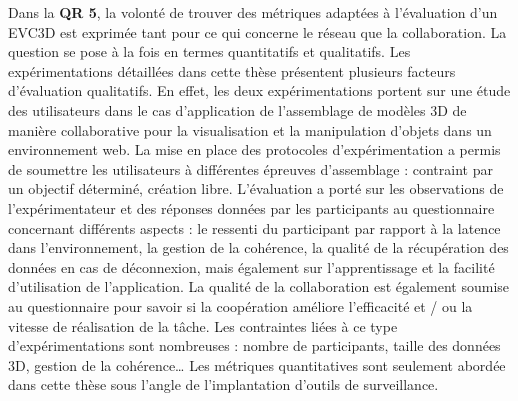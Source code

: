 %
Dans la \textbf{QR 5}, la volonté de trouver des métriques adaptées à l'évaluation 
d'un \gls{EVC3D} est exprimée tant pour ce qui concerne le réseau que la 
collaboration. La 
question se pose à la fois en termes quantitatifs et qualitatifs.
Les expérimentations détaillées dans cette thèse présentent plusieurs facteurs 
d'évaluation qualitatifs. En effet, les deux expérimentations portent sur une étude 
des utilisateurs dans le cas d'application de l'assemblage de modèles 3D de 
manière collaborative pour la visualisation et la manipulation d'objets dans un 
environnement web.
La mise en place des protocoles d'expérimentation a permis de soumettre les 
utilisateurs à différentes épreuves d'assemblage : contraint par un objectif 
déterminé, création libre. 
L'évaluation a porté sur les observations de l'expérimentateur et des réponses 
données par les participants au questionnaire concernant différents aspects : le 
ressenti du participant par rapport à la latence dans l'environnement, la gestion de 
la cohérence, la qualité de la récupération des données en cas de déconnexion, 
mais également sur l'apprentissage et la facilité d'utilisation de l'application. La 
qualité de la collaboration est également soumise au questionnaire pour savoir si 
la coopération améliore l'efficacité et / ou la vitesse de réalisation de la tâche.
Les contraintes liées à ce type d'expérimentations sont nombreuses : nombre de 
participants, taille des données 3D, gestion de la cohérence\dots 
Les métriques quantitatives sont seulement abordée dans cette thèse sous l'angle 
de l'implantation d'outils de surveillance.


